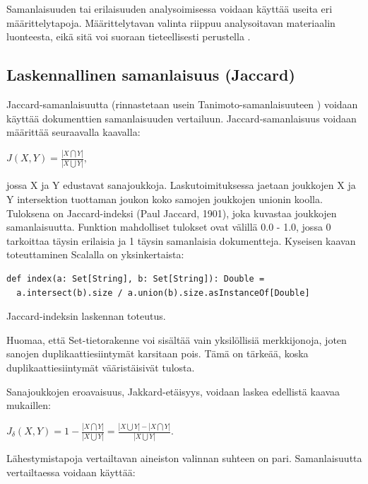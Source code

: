 \documentclass[11pt,a4paper,oneside]{memoir}
\begin{document}
Samanlaisuuden tai erilaisuuden analysoimisessa voidaan käyttää useita eri  määrittelytapoja. Määrittelytavan valinta riippuu analysoitavan materiaalin luonteesta, eikä sitä voi suoraan tieteellisesti perustella \cite[s. 298]{encyclopedia-of-distances}.

\subsection{Laskennallinen samanlaisuus (Jaccard)}
Jaccard-samanlaisuutta (rinnastetaan usein Tanimoto-samanlaisuuteen \cite[s. 299]{encyclopedia-of-distances}) voidaan käyttää dokumenttien samanlaisuuden vertailuun. Jaccard-samanlaisuus voidaan määrittää seuraavalla kaavalla:

\begin{math}
J(X, Y) = \frac{| X \bigcap Y |}{| X \bigcup Y |},
\end{math}

jossa X ja Y edustavat sanajoukkoja. Laskutoimituksessa jaetaan joukkojen X ja Y intersektion tuottaman joukon koko samojen joukkojen unionin koolla. Tuloksena on Jaccard-indeksi (Paul Jaccard, 1901), joka kuvastaa joukkojen samanlaisuutta. Funktion mahdolliset tulokset ovat välillä 0.0 - 1.0, jossa 0 tarkoittaa täysin erilaisia ja 1 täysin samanlaisia dokumentteja. Kyseisen kaavan toteuttaminen Scalalla on yksinkertaista:

\begin{program}
  \begin{verbatim}
def index(a: Set[String], b: Set[String]): Double =
  a.intersect(b).size / a.union(b).size.asInstanceOf[Double] \end{verbatim}
  \caption{Jaccard-indeksin laskennan toteutus.}
\end{program}

Huomaa, että Set-tietorakenne voi sisältää vain yksilöllisiä merkkijonoja, joten sanojen duplikaattiesiintymät karsitaan pois. Tämä on tärkeää, koska duplikaattiesiintymät vääristäisivät tulosta.

Sanajoukkojen eroavaisuus, Jakkard-etäisyys, voidaan laskea edellistä kaavaa mukaillen:

\begin{math}
J_\delta(X, Y) = 1 - \frac{| X \bigcap Y |}{| X \bigcup Y |} = \frac{| X \bigcup Y | - | X \bigcap Y |}{| X \bigcup Y |}.
\end{math}

Lähestymistapoja vertailtavan aineiston valinnan suhteen on pari. Samanlaisuutta vertailtaessa voidaan käyttää:
\end{document}
